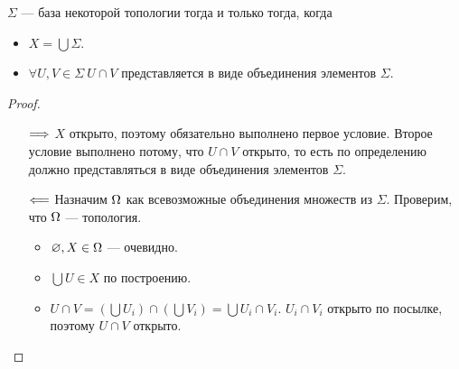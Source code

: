 \begin{theorem}
	$\Sigma$ --- база некоторой топологии тогда и только тогда, когда
	\begin{itemize}
		\item $X = \bigcup{\Sigma}$.
		\item $\forall U, V \in \Sigma~ U \cap V$ представляется в виде
			объединения элементов $\Sigma$.
	\end{itemize}
\end{theorem}
\begin{proof}
	\enewline
	\begin{itemize}
		\item[$\Longrightarrow$] $X$ открыто, поэтому обязательно выполнено первое
			условие. Второе условие выполнено потому,
			что $U \cap V$ открыто, то есть по определению должно представляться
			в виде объединения элементов $\Sigma$.
		\item[$\Longleftarrow$] Назначим $\Omega$ как всевозможные объединения множеств из $\Sigma$.
			Проверим, что $\Omega$ --- топология.
			\begin{itemize}
				\item $\varnothing, X \in \Omega$ --- очевидно.
				\item $\bigcup{U} \in X$ по построению.
				\item $U \cap V = \left(\bigcup{U_i}\right) \cap 
					\left(\bigcup{V_i}\right) = \bigcup{U_i \cap V_i}$.
					$U_i \cap V_i$ открыто по посылке, поэтому $U \cap V$
					открыто.
			\end{itemize}
	\end{itemize}
\end{proof}
